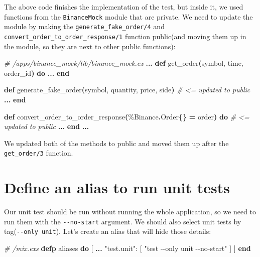 \documentclass[
  oneside]{book}
\newenvironment{Shaded}{\begin{snugshade}}{\end{snugshade}}
\newcommand{\CommentTok}[1]{\textcolor[rgb]{0.56,0.35,0.01}{\textit{#1}}}
\newcommand{\ConstantTok}[1]{\textcolor[rgb]{0.56,0.35,0.01}{#1}}
\newcommand{\FunctionTok}[1]{\textcolor[rgb]{0.13,0.29,0.53}{\textbf{#1}}}
\newcommand{\KeywordTok}[1]{\textcolor[rgb]{0.13,0.29,0.53}{\textbf{#1}}}
\newcommand{\NormalTok}[1]{#1}
\newcommand{\OperatorTok}[1]{\textcolor[rgb]{0.81,0.36,0.00}{\textbf{#1}}}
\newcommand{\OtherTok}[1]{\textcolor[rgb]{0.56,0.35,0.01}{#1}}
\newcommand{\StringTok}[1]{\textcolor[rgb]{0.31,0.60,0.02}{#1}}
\begin{document}
The above code finishes the implementation of the test, but inside it, we used functions from the \texttt{BinanceMock} module that are private. We need to update the module by making the \texttt{generate\_fake\_order/4} and\\
\texttt{convert\_order\_to\_order\_response/1} function public(and moving them up in the module, so they are next to other public functions):

\begin{Shaded}
\begin{Highlighting}[]
\CommentTok{\# /apps/binance\_mock/lib/binance\_mock.ex}
  \OperatorTok{...}
  \KeywordTok{def}\NormalTok{ get\_order}\FunctionTok{(}\NormalTok{symbol, time, order\_id}\FunctionTok{)} \KeywordTok{do}
    \OperatorTok{...}
  \KeywordTok{end}

  \KeywordTok{def}\NormalTok{ generate\_fake\_order}\FunctionTok{(}\NormalTok{symbol, quantity, price, side}\FunctionTok{)} \CommentTok{\# \textless{}= updated to public}
    \OperatorTok{...}
  \KeywordTok{end}

  \KeywordTok{def}\NormalTok{ convert\_order\_to\_order\_response}\FunctionTok{(}\NormalTok{\%}\ConstantTok{Binance}\OperatorTok{.}\ConstantTok{Order}\FunctionTok{\{\}} \OperatorTok{=}\NormalTok{ order}\FunctionTok{)} \KeywordTok{do} \CommentTok{\# \textless{}= updated to public}
    \OperatorTok{...}
  \KeywordTok{end}
\OperatorTok{...}
\end{Highlighting}
\end{Shaded}

We updated both of the methods to public and moved them up after the \texttt{get\_order/3} function.

\section{Define an alias to run unit tests}\label{define-an-alias-to-run-unit-tests}

Our unit test should be run without running the whole application, so we need to run them with the \texttt{-\/-no-start} argument. We should also select unit tests by tag(\texttt{-\/-only\ unit}). Let's create an alias that will hide those details:

\begin{Shaded}
\begin{Highlighting}[]
\CommentTok{\# /mix.exs}
  \KeywordTok{defp}\NormalTok{ aliases }\KeywordTok{do}
    \OtherTok{[}
      \OperatorTok{...}
      \StringTok{"test.unit"}\NormalTok{: }\OtherTok{[}
        \StringTok{"test {-}{-}only unit {-}{-}no{-}start"}
      \OtherTok{]}
    \OtherTok{]}
  \KeywordTok{end}
\end{Highlighting}
\end{Shaded}
\end{document}
